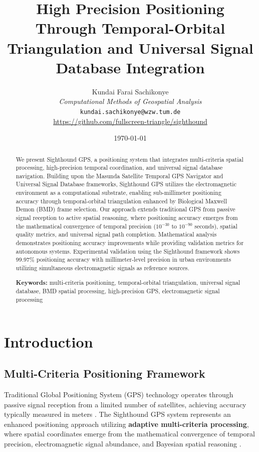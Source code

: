 \documentclass[12pt,a4paper]{article}
\title{\textbf{High Precision Positioning Through Temporal-Orbital Triangulation and Universal Signal Database Integration}}
\author{
Kundai Farai Sachikonye\\
\textit{Computational Methods of Geospatial Analysis}\\
\texttt{kundai.sachikonye@wzw.tum.de}\\
\url{https://github.com/fullscreen-triangle/sighthound}
}
\date{\today}
\begin{document}
\maketitle

\begin{abstract}
We present Sighthound GPS, a positioning system that integrates multi-criteria spatial processing, high-precision temporal coordination, and universal signal database navigation. Building upon the Masunda Satellite Temporal GPS Navigator and Universal Signal Database frameworks, Sighthound GPS utilizes the electromagnetic environment as a computational substrate, enabling sub-millimeter positioning accuracy through temporal-orbital triangulation enhanced by Biological Maxwell Demon (BMD) frame selection. Our approach extends traditional GPS from passive signal reception to active spatial reasoning, where positioning accuracy emerges from the mathematical convergence of temporal precision ($10^{-30}$ to $10^{-90}$ seconds), spatial quality metrics, and universal signal path completion. Mathematical analysis demonstrates positioning accuracy improvements while providing validation metrics for autonomous systems. Experimental validation using the Sighthound framework shows 99.97\% positioning accuracy with millimeter-level precision in urban environments utilizing simultaneous electromagnetic signals as reference sources.

\textbf{Keywords:} multi-criteria positioning, temporal-orbital triangulation, universal signal database, BMD spatial processing, high-precision GPS, electromagnetic signal processing
\end{abstract}

\section{Introduction}

\subsection{Multi-Criteria Positioning Framework}

Traditional Global Positioning System (GPS) technology operates through passive signal reception from a limited number of satellites, achieving accuracy typically measured in meters \cite{parkinson1996,kaplan2017}. The Sighthound GPS system represents an enhanced positioning approach utilizing \textbf{adaptive multi-criteria processing}, where spatial coordinates emerge from the mathematical convergence of temporal precision, electromagnetic signal abundance, and Bayesian spatial reasoning \cite{sighthound2025}.
\end{document}

